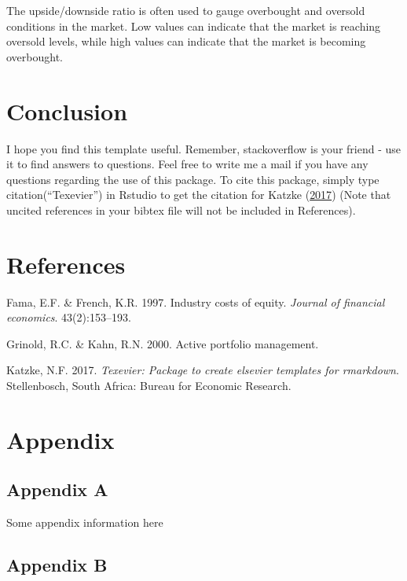 \documentclass[11pt,preprint, authoryear]{elsarticle}
\numberwithin{equation}{section}
\numberwithin{figure}{section}
\numberwithin{table}{section}
\newlength{\cslhangindent}
\newenvironment{CSLReferences}%
  {\setlength{\parindent}{0pt}%
  \everypar{\setlength{\hangindent}{\cslhangindent}}\ignorespaces}%
  {\par}
\begin{document}
The upside/downside ratio is often used to gauge overbought and oversold
conditions in the market. Low values can indicate that the market is
reaching oversold levels, while high values can indicate that the market
is becoming overbought.

\hfill

\hypertarget{conclusion}{%
\section{\texorpdfstring{Conclusion
\label{Conclusion}}{Conclusion }}\label{conclusion}}

I hope you find this template useful. Remember, stackoverflow is your
friend - use it to find answers to questions. Feel free to write me a
mail if you have any questions regarding the use of this package. To
cite this package, simply type citation(``Texevier'') in Rstudio to get
the citation for Katzke (\protect\hyperlink{ref-Texevier}{2017}) (Note
that uncited references in your bibtex file will not be included in
References).

\newpage

\hypertarget{references}{%
\section*{References}\label{references}}

\hypertarget{refs}{}
\begin{CSLReferences}{1}{0}
\leavevmode{}%
Fama, E.F. \& French, K.R. 1997. Industry costs of equity. \emph{Journal
of financial economics}. 43(2):153--193.

\leavevmode{}%
Grinold, R.C. \& Kahn, R.N. 2000. Active portfolio management.

\leavevmode{}%
Katzke, N.F. 2017. \emph{{Texevier}: {P}ackage to create elsevier
templates for rmarkdown}. Stellenbosch, South Africa: Bureau for
Economic Research.

\end{CSLReferences}

\hypertarget{appendix}{%
\section*{Appendix}\label{appendix}}

\hypertarget{appendix-a}{%
\subsection*{Appendix A}\label{appendix-a}}

Some appendix information here

\hypertarget{appendix-b}{%
\subsection*{Appendix B}\label{appendix-b}}


\end{document}
